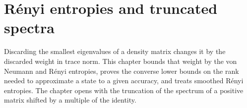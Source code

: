 \chapter{R\'enyi entropies and truncated spectra}
\label{ch:renyi}

Discarding the smallest eigenvalues of a density matrix changes it by the
discarded weight in trace norm. This chapter bounds that weight by the von
Neumann and R\'enyi entropies, proves the converse lower bounds on the rank
needed to approximate a state to a given accuracy, and treats smoothed R\'enyi
entropies. The chapter opens with the truncation of the spectrum of a positive
matrix shifted by a multiple of the identity.














